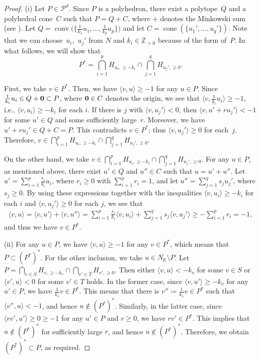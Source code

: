 \documentclass[pdftex]{sigma}%
\numberwithin{equation}{section}
\numberwithin{figure}{section}
\numberwithin{table}{section}
\newcommand{\ZZ}{\mathbb{Z}}
\newcommand{\RR}{\mathbb{R}}
\newcommand{\calP}{\mathcal{P}}
\begin{document}
\begin{proof}(i) Let $P \in \calP^d$. Since $P$ is a polyhedron, there exist a polytope~$Q$ and a polyhedral cone~$C$ such that
$P=Q+C$, where $+$ denotes the Minkowski sum (see \cite[Corollary~7.1b]{Sch}).
Let $Q=\operatorname{conv}\big(\big\{\frac{1}{k_1}u_1,\dots,\frac{1}{k_p}u_p\big\}\big)$ and let $C=\operatorname{cone}(\{u_1',\dots,u_q'\})$.
Note that we can choose~$u_i$,~$u_j'$ from $N$ and $k_i \in \ZZ_{>0}$ because of the form of~$P$.
In what follows, we will show that
\begin{displaymath}
P^*=\bigcap_{i=1}^p H_{u_i,\geq -k_i} \cap \bigcap_{j=1}^qH_{u_j',\geq 0}.
\end{displaymath}

First, we take $v \in P^*$. Then, we have $\langle v,u \rangle \geq -1$ for any $u \in P$.
Since $\frac{1}{k_i}u_i \in Q+{\bf 0} \subset P$, where ${\bf 0} \in C$ denotes the origin,
we see that $\langle v, \frac{1}{k_i}u_i \rangle \geq -1$, i.e., $\langle v, u_i \rangle \geq -k_i$ for each $i$.
If there is $j$ with $\langle v,u_j' \rangle<0$, then $\langle v, u'+ru_j' \rangle < -1$ for some $u' \in Q$ and some sufficiently large~$r$.
Moreover, we have $u'+ru_j' \in Q+C=P$. This contradicts $v \in P^*$; thus $\langle v,u_j' \rangle\geq 0$ for each~$j$.
Therefore, $v \in \bigcap_{i=1}^p H_{u_i,\geq -k_i} \cap \bigcap_{j=1}^qH_{u_j',\geq 0}$.

On the other hand, we take $v \in \bigcap_{i=1}^p H_{u_i,\geq -k_i} \cap \bigcap_{j=1}^qH_{u_j',\geq 0}$.
For any $u \in P$, as mentioned above, there exist $u' \in Q$ and $u'' \in C$ such that $u=u'+u''$.
Let $u'=\sum_{i=1}^p \frac{r_i}{k_i}u_i$, where $r_i \geq 0$ with $\sum_{i=1}^pr_i=1$, and let $u''=\sum_{j=1}^q s_ju_j'$, where $s_j \geq 0$.
By using these expressions together with the inequalities $\langle v,u_i \rangle \geq -k_i$ for each $i$ and $\langle v,u_j' \rangle \geq 0$ for each $j$, we see that
\begin{align*}
\langle v,u \rangle = \langle v,u' \rangle+\langle v,u'' \rangle =
\sum_{i=1}^p \frac{r_i}{k_i}\langle v,u_i \rangle+\sum_{j=1}^q s_j\langle v,u_j' \rangle \geq -\sum_{i=1}^pr_i=-1,
\end{align*}
and thus we have $v \in P^*$.

(ii) For any $u \in P$, we have $\langle v,u\rangle\geq -1$ for any $v \in P^*$, which means that $P \subset (P^*)^*$.
For the other inclusion, we take $u \in N_\RR \setminus P$.
Let $P=\bigcap_{v \in S} H_{v,\geq -k_v} \cap \bigcap_{v' \in T}H_{v',\geq 0}$.
Then either $\langle v,u \rangle <-k_v$ for some $v \in S$ or $\langle v',u \rangle < 0$ for some $v' \in T$ holds.
In the former case, since $\langle v,u' \rangle \geq -k_v$ for any $u' \in P$, we have $\frac{1}{k_v}v \in P^*$.
This means that there is $v''\coloneqq\frac{1}{k_v}v \in P^*$ such that $\langle v'',u \rangle<-1$, and hence $u \not\in (P^*)^*$.
Similarly, in the latter case, since $\langle rv',u' \rangle \geq 0 \geq -1$ for any $u' \in P$ and $r \geq 0$, we have $rv' \in P^*$.
This implies that $u \not\in (P^*)^*$ for sufficiently large $r$, and hence $u \not\in (P^*)^*$. Therefore, we obtain $(P^*)^* \subset P$, as required.
\end{proof}
\end{document}
